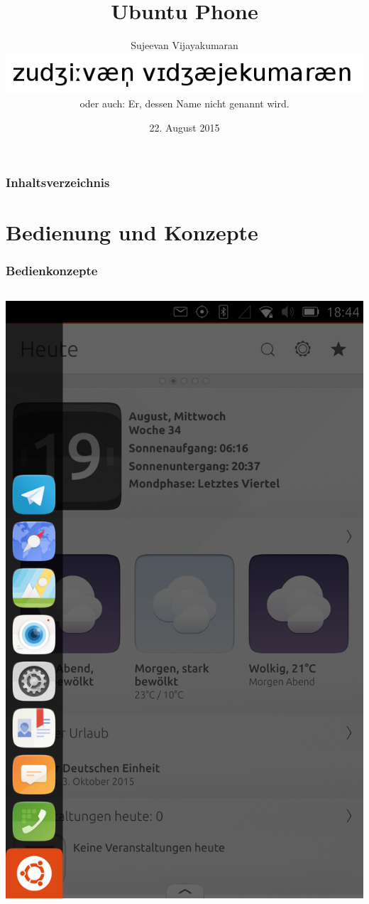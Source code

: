 \documentclass{beamer}
\title{Ubuntu Phone}
\author[Sujeevan Vijayakumaran]{Sujeevan Vijayakumaran\\
\includegraphics[width=0.3\linewidth]{images/name.png}\\
\tiny{oder auch: Er, dessen Name nicht genannt wird.}}
\date{22. August 2015}
\institute{FrOSCon}
\begin{document}
\maketitle
\begin{frame}
  \frametitle{Inhaltsverzeichnis}
  \tableofcontents
\end{frame}

\section{Bedienung und Konzepte}

\frame{\sectionpage}

\begin{frame}
  \frametitle{Bedienkonzepte}
  \begin{columns}
      \includegraphics[width=\textwidth]{images/unity-launcher}

\end{columns}
\end{frame}
\end{document}
